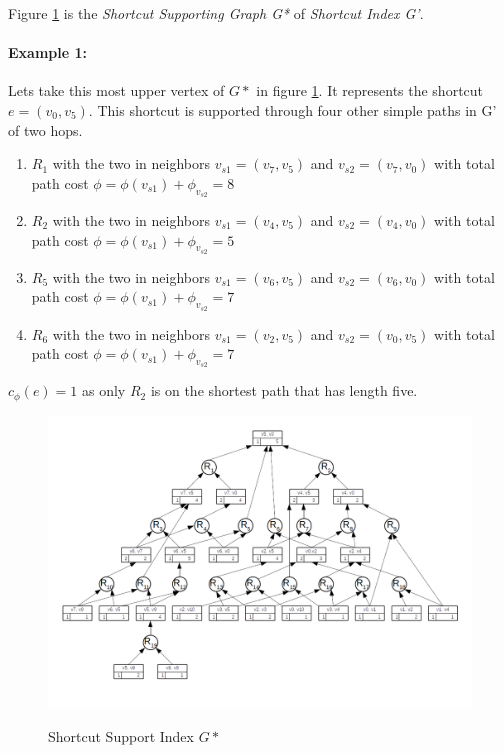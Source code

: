 \documentclass[twocolumn]{article}
\begin{document}
Figure \ref{fig:SsGraph} is the \textit{Shortcut Supporting Graph G*} of \textit{Shortcut Index G'}.
\\
\paragraph{Example 1:} Lets take this most upper vertex of $G*$ in figure \ref{fig:SsGraph}. It represents
the shortcut $e= (v_0, v_5)$. This shortcut is supported through four other simple paths in G' of two hops.
\begin{enumerate}
    \item $R_1$ with the two in neighbors $v_{s1} = (v_7, v_5)$ and $v_{s2} = (v_7, v_0)$ with total path cost $\phi = \phi(v_{s1}) + \phi_{v_{s2}} = 8$
    \item $R_2$ with the two in neighbors $v_{s1} = (v_4, v_5)$ and $v_{s2} = (v_4, v_0)$ with total path cost $\phi = \phi(v_{s1}) + \phi_{v_{s2}} = 5$
    \item $R_5$ with the two in neighbors $v_{s1} = (v_6, v_5)$ and $v_{s2} = (v_6, v_0)$ with total path cost $\phi = \phi(v_{s1}) + \phi_{v_{s2}} = 7$
    \item $R_6$ with the two in neighbors $v_{s1} = (v_2, v_5)$ and $v_{s2} = (v_0, v_5)$ with total path cost $\phi = \phi(v_{s1}) + \phi_{v_{s2}} = 7$
\end{enumerate}

$c_{\phi}(e) = 1$ as only $R_2$ is on the shortest path that has length five. 

\begin{figure}[t]
    \caption{Shortcut Support Index $G*$}
    \centering
    \includegraphics[width=\textwidth]{SsGraph}
    \label{fig:SsGraph}
\end{figure}
\end{document}

